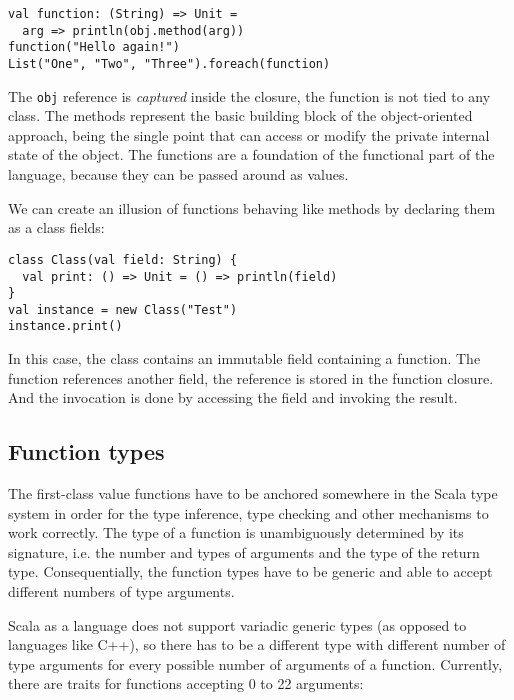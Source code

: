 \lstset{style=Scala}
\begin{lstlisting}
val function: (String) => Unit = 
  arg => println(obj.method(arg))
function("Hello again!")
List("One", "Two", "Three").foreach(function)
\end{lstlisting}

The \lstinline|obj| reference is \textit{captured} inside the closure, the function is not tied to any class. The methods represent the basic building block of the object-oriented approach, being the single point that can access or modify the private internal state of the object. The functions are a foundation of the functional part of the language, because they can be passed around as values.

We can create an illusion of functions behaving like methods by declaring them as a class fields:

\lstset{style=Scala}
\begin{lstlisting}
class Class(val field: String) {
  val print: () => Unit = () => println(field)
}
val instance = new Class("Test")
instance.print()
\end{lstlisting}

In this case, the class contains an immutable field  containing a function. The function references another field, the reference is stored in the function closure. And the invocation is done by accessing the  field and invoking the result.


\subsection{Function types}
\label{subsec:functiontypes}

The first-class value functions have to be anchored somewhere in the Scala type system in order for the type inference, type checking and other mechanisms to work correctly. The type of a function is unambiguously determined by its signature, i.e. the number and types of arguments and the type of the return type. Consequentially, the function types have to be generic and able to accept different numbers of type arguments.

Scala as a language does not support variadic generic types (as opposed to languages like C++), so there has to be a different type with different number of type arguments for every possible number of arguments of a function. Currently, there are traits for functions accepting 0 to 22 arguments:

